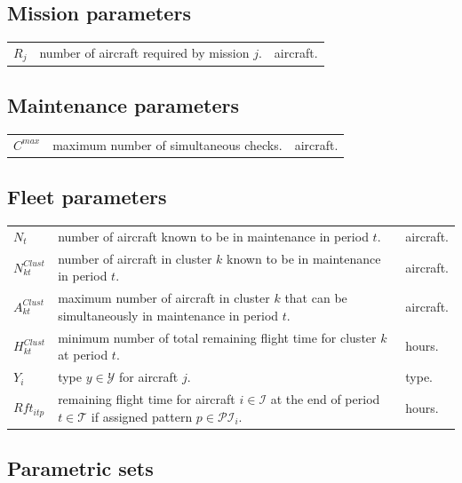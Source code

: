 \documentclass[a4paper,11pt]{article}
\begin{document}
    \subsection{Mission parameters}

        \begin{tabular}{p{15mm}p{125mm}p{15mm}}
            $R_j$             & number of aircraft required by mission $j$. & aircraft. \\
        \end{tabular}

    \subsection{Maintenance parameters}

        \begin{tabular}{p{15mm}p{125mm}p{15mm}}
            $C^{max}$         & maximum number of simultaneous checks. & aircraft. \\
        \end{tabular}

    \subsection{Fleet parameters}

        \begin{tabular}{p{15mm}p{125mm}p{15mm}}
            $N_t$               & number of aircraft known to be in maintenance in period $t$. & aircraft. \\
            $N^{Clust}_{kt}$    & number of aircraft in cluster $k$ known to be in maintenance in period $t$. & aircraft. \\
            $A^{Clust}_{kt}$    & maximum number of aircraft in cluster $k$ that can be simultaneously in maintenance in period $t$. & aircraft. \\
            $H^{Clust}_{kt}$    & minimum number of total remaining flight time for cluster $k$ at period $t$. & hours. \\
            $Y_i$               & type $y \in \mathcal{Y}$ for aircraft $j$. & type. \\
            $Rft_{itp}$           & remaining flight time for aircraft $i \in \mathcal{I}$ at the end of period $t \in \mathcal{T}$ if assigned pattern $p \in \mathcal{PI}_i$. & hours. \\
        \end{tabular}

    \subsection{Parametric sets}
\end{document}
